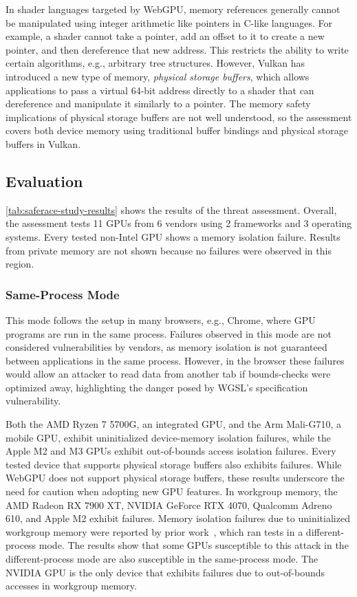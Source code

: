 In shader languages targeted by WebGPU, memory references generally cannot be manipulated using integer arithmetic like pointers in C-like languages. For example, a shader cannot take a pointer, add an offset to it to create a new pointer, and then dereference that new address. This restricts the ability to write certain algorithms, e.g., arbitrary tree structures. However, Vulkan has introduced a new type of memory, \textit{physical storage buffers}, which allows applications to pass a virtual 64-bit address directly to a shader that can dereference and manipulate it similarly to a pointer. The memory safety implications of physical storage buffers are not well understood, so the assessment covers both device memory using traditional buffer bindings and physical storage buffers in Vulkan.

\subsection{Evaluation \label{sec:saferace-assess-bu-eval}}

\mytablong\ref{tab:saferace-study-results} shows the results of the threat assessment. Overall, the assessment tests 11 GPUs from 6 vendors using 2 frameworks and 3 operating systems. Every tested non-Intel GPU shows a memory isolation failure. Results from private memory are not shown because no failures were observed in this region.

\subsubsection{Same-Process Mode\label{sec:saferace-sp-config}}

This mode follows the setup in many browsers, e.g., Chrome, where GPU programs are run in the same process. Failures observed in this mode are not considered vulnerabilities by vendors, as memory isolation is not guaranteed between applications in the same process. However, in the browser these failures would allow an attacker to read data from another tab if bounds-checks were optimized away, highlighting the danger posed by WGSL's specification vulnerability.

Both the AMD Ryzen 7 5700G, an integrated GPU, and the Arm Mali-G710, a mobile GPU, exhibit uninitialized device-memory isolation failures, while the Apple M2 and M3 GPUs exhibit out-of-bounds access isolation failures. Every tested device that supports physical storage buffers also exhibits failures. While WebGPU does not support physical storage buffers, these results underscore the need for caution when adopting new GPU features. In workgroup memory, the AMD Radeon RX 7900 XT, NVIDIA GeForce RTX 4070, Qualcomm Adreno 610, and Apple M2 exhibit failures. Memory isolation failures due to uninitialized workgroup memory were reported by prior work~\cite{sorensen2024leftoverlocals}, which ran tests in a different-process mode. The results show that some GPUs susceptible to this attack in the different-process mode are also susceptible in the same-process mode. The NVIDIA GPU is the only device that exhibits failures due to out-of-bounds accesses in workgroup memory.

